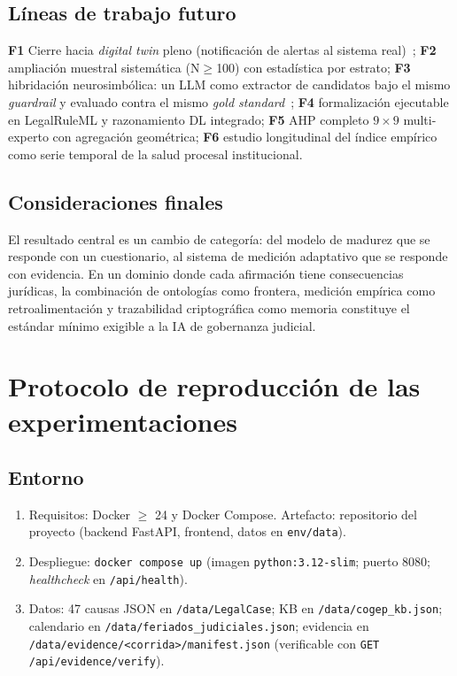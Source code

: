 \documentclass[a4paper,openany,12pt]{book}
\begin{document}
\section{Líneas de trabajo futuro}
\textbf{F1} Cierre hacia \textit{digital twin} pleno (notificación de alertas al sistema real)~\cite{kritzinger2018,zheng2022}; \textbf{F2} ampliación muestral sistemática (N$\ge$100) con estadística por estrato; \textbf{F3} hibridación neurosimbólica: un LLM como extractor de candidatos bajo el mismo \textit{guardrail} y evaluado contra el mismo \textit{gold standard}~\cite{garcez2023}; \textbf{F4} formalización ejecutable en LegalRuleML y razonamiento DL integrado; \textbf{F5} AHP completo $9{\times}9$ multi-experto con agregación geométrica; \textbf{F6} estudio longitudinal del índice empírico como serie temporal de la salud procesal institucional.
\section{Consideraciones finales}
El resultado central es un cambio de categoría: del modelo de madurez que se responde con un cuestionario, al sistema de medición adaptativo que se responde con evidencia. En un dominio donde cada afirmación tiene consecuencias jurídicas, la combinación de ontologías como frontera, medición empírica como retroalimentación y trazabilidad criptográfica como memoria constituye el estándar mínimo exigible a la IA de gobernanza judicial.

\appendix
\chapter{Protocolo de reproducción de las experimentaciones}\label{ap:repro}
\section{Entorno}
\begin{enumerate}
\item Requisitos: Docker $\ge$ 24 y Docker Compose. Artefacto: repositorio del proyecto (backend FastAPI, frontend, datos en \texttt{env/data}).
\item Despliegue: \texttt{docker compose up} (imagen \texttt{python:3.12-slim}; puerto 8080; \textit{healthcheck} en \texttt{/api/health}).
\item Datos: 47 causas JSON en \texttt{/data/LegalCase}; KB en \texttt{/data/cogep\_kb.json}; calendario en \texttt{/data/feriados\_judiciales.json}; evidencia en \texttt{/data/evidence/<corrida>/manifest.json} (verificable con \texttt{GET /api/evidence/verify}).
\end{enumerate}
\end{document}
